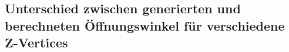 \documentclass[a4paper,11pt,oneside,final,german,openbib,pdftex]{scrbook}
\begin{document}
{%


\subsection{Unterschied zwischen generierten und berechneten \"Offnungswinkel f\"ur verschiedene Z-Vertices}





}
\end{document}

